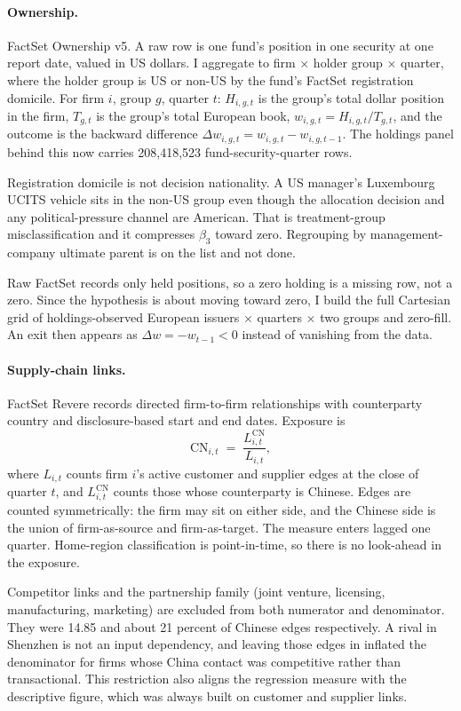 \documentclass[11pt]{article}
\begin{document}
\paragraph{Ownership.} FactSet Ownership v5. A raw row is one fund's position
in one security at one report date, valued in US dollars. I aggregate to firm
$\times$ holder group $\times$ quarter, where the holder group is US or
non-US by the fund's FactSet registration domicile. For firm $i$, group $g$,
quarter $t$: $H_{i,g,t}$ is the group's total dollar position in the firm,
$T_{g,t}$ is the group's total European book, $w_{i,g,t} = H_{i,g,t}/T_{g,t}$,
and the outcome is the backward difference
$\Delta w_{i,g,t} = w_{i,g,t} - w_{i,g,t-1}$. The holdings panel behind this
now carries 208,418,523 fund-security-quarter rows.

Registration domicile is not decision nationality. A US manager's Luxembourg
UCITS vehicle sits in the non-US group even though the allocation decision and
any political-pressure channel are American. That is treatment-group
misclassification and it compresses $\beta_3$ toward zero. Regrouping by
management-company ultimate parent is on the list and not done.

Raw FactSet records only held positions, so a zero holding is a missing row,
not a zero. Since the hypothesis is about moving toward zero, I build the full
Cartesian grid of holdings-observed European issuers $\times$ quarters
$\times$ two groups and zero-fill. An exit then appears as
$\Delta w = -w_{t-1} < 0$ instead of vanishing from the data.

\paragraph{Supply-chain links.} FactSet Revere records directed firm-to-firm
relationships with counterparty country and disclosure-based start and end
dates. Exposure is
\[
\mathrm{CN}_{i,t} \;=\; \frac{L^{\mathrm{CN}}_{i,t}}{L_{i,t}},
\]
where $L_{i,t}$ counts firm $i$'s active customer and supplier edges at the
close of quarter $t$, and $L^{\mathrm{CN}}_{i,t}$ counts those whose
counterparty is Chinese. Edges are counted symmetrically: the firm may sit on
either side, and the Chinese side is the union of firm-as-source and
firm-as-target. The measure enters lagged one quarter. Home-region classification is point-in-time, so
there is no look-ahead in the exposure.

Competitor links and the partnership family (joint venture, licensing,
manufacturing, marketing) are excluded from both numerator and denominator.
They were 14.85 and about 21 percent of Chinese edges respectively. A rival in
Shenzhen is not an input dependency, and leaving those edges in inflated the
denominator for firms whose China contact was competitive rather than
transactional. This restriction also aligns the regression measure with the
descriptive figure, which was always built on customer and supplier links.
\end{document}
